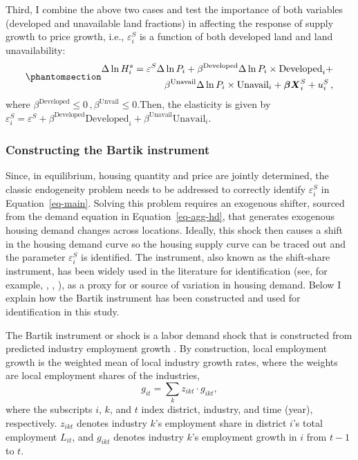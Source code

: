 \documentclass[
  12pt,
]{article}
\begin{document}
Third, I combine the above two cases and test the importance of both
variables (developed and unavailable land fractions) in affecting the
response of supply growth to price growth, i.e., \(\varepsilon^S_i\) is
a function of both developed land and land unavailability:
\begin{equation}\phantomsection\label{eq-case-4}{
\begin{aligned}
\Delta\ln H_i^s = \varepsilon^S\Delta\ln P_i + \beta^{\text{Developed}} \Delta \ln P_i\times\text{Developed}_i + \\
\beta^{\text{Unavail}} \Delta \ln P_i\times\text{Unavail}_i + \boldsymbol{\beta}\boldsymbol{X}_i^S + u^S_i\,,
\end{aligned} 
}\end{equation} where
\(\beta^{\text{Developed}} \le 0\,, \beta^{\text{Unvail}}\le0\).Then,
the elasticity is given by
\(\varepsilon^S_i = \varepsilon^S + \beta^{\text{Developed}}\text{Developed}_i + \beta^{\text{Unavail}}\text{Unavail}_i\).

\subsubsection{Constructing the Bartik
instrument}\label{constructing-the-bartik-instrument}

Since, in equilibrium, housing quantity and price are jointly
determined, the classic endogeneity problem needs to be addressed to
correctly identify \(\varepsilon^S_i\) in Equation~\ref{eq-main}.
Solving this problem requires an exogenous shifter, sourced from the
demand equation in Equation~\ref{eq-agg-hd}, that generates exogenous
housing demand changes across locations. Ideally, this shock then causes
a shift in the housing demand curve so the housing supply curve can be
traced out and the parameter \(\varepsilon^S_i\) is identified. The
\citet{bartik_1991} instrument, also known as the shift-share
instrument, has been widely used in the literature for identification
(see, for example, \citet{saiz_2010}, \citet{hilber_vermeulen_2016},
\citet{baum-snow_han_2019}), as a proxy for or source of variation in
housing demand. Below I explain how the Bartik instrument has been
constructed and used for identification in this study.

The Bartik instrument or shock is a labor demand shock that is
constructed from predicted industry employment growth
\citep{goldsmith-pinkham_etal_2020, blanchard_katz_1992, bartik_1991}.
By construction, local employment growth is the weighted mean of local
industry growth rates, where the weights are local employment shares of
the industries, \[
g_{it} = \sum_k z_{ikt}\cdot g_{ikt},
\] where the subscripts \(i\), \(k\), and \(t\) index district,
industry, and time (year), respectively. \(z_{ikt}\) denotes industry
\(k\)'s employment share in district \(i\)'s total employment
\(L_{it}\), and \(g_{ikt}\) denotes industry \(k\)'s employment growth
in \(i\) from \(t-1\) to \(t\).
\end{document}
